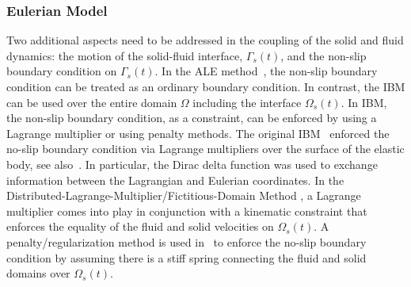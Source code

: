 \documentclass[final,3p,times]{elsarticle}
\begin{document}
\subsubsection{Eulerian Model}
Two additional aspects need to be addressed in the coupling of the solid and fluid dynamics: the motion of the solid-fluid interface, $\Gamma_s(t)$, and the non-slip boundary condition on $\Gamma_s(t)$. In the ALE method~\cite{Hu96}, the non-slip boundary condition can be treated as an ordinary boundary condition. In contrast, the IBM can be used over the entire domain $\Omega$ including the interface $\Omega_s(t)$. In IBM, the non-slip boundary condition, as a constraint, can be enforced by using a Lagrange multiplier or using penalty methods. The original IBM~\cite{Peskin1977} enforced the no-slip boundary condition via Lagrange multipliers over the surface of the elastic body, see also~\cite{Peskin2002}. In particular, the Dirac delta function was used to exchange information between the Lagrangian 
and Eulerian coordinates. In the Distributed-Lagrange-Multiplier/Fictitious-Domain Method
\cite{Glowinski1999}, a Lagrange multiplier comes into play in conjunction with a kinematic constraint that enforces the equality of the fluid and solid velocities on $\Omega_s(t)$. 
A penalty/regularization method is used in~\cite{Kim2016} to enforce the no-slip boundary condition by assuming there is a stiff spring connecting the fluid and solid domains over $\Omega_s(t)$. 
\end{document}

